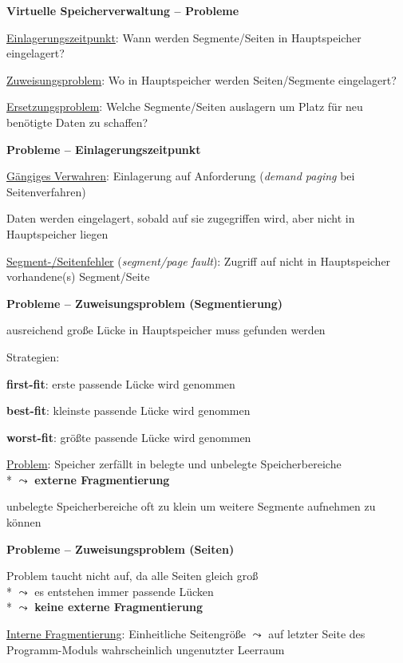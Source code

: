 \newpage

\textbf{Virtuelle Speicherverwaltung -- Probleme}
\begin{items}
  \item \underline{Einlagerungszeitpunkt}: Wann werden Segmente/Seiten in Hauptspeicher eingelagert?
  \item \underline{Zuweisungsproblem}: Wo in Hauptspeicher werden Seiten/Segmente eingelagert?
  \item \underline{Ersetzungsproblem}: Welche Segmente/Seiten auslagern um Platz für neu benötigte Daten zu schaffen?
\end{items}

\textbf{Probleme -- Einlagerungszeitpunkt}
\begin{items}
  \item \underline{Gängiges Verwahren}: Einlagerung auf Anforderung (\emph{demand paging} bei Seitenverfahren)
  \item Daten werden eingelagert, sobald auf sie zugegriffen wird, aber nicht in Hauptspeicher liegen
  \item \underline{Segment-/Seitenfehler} (\emph{segment/page fault}): Zugriff auf nicht in Hauptspeicher vorhandene(s) Segment/Seite
\end{items}

\textbf{Probleme -- Zuweisungsproblem (Segmentierung)}
\begin{items}
  \item ausreichend große Lücke in Hauptspeicher muss gefunden werden
  \item Strategien:
  \begin{enumeration}
    \item \textbf{first-fit}: erste passende Lücke wird genommen
    \item \textbf{best-fit}: kleinste passende Lücke wird genommen
    \item \textbf{worst-fit}: größte passende Lücke wird genommen
  \end{enumeration}
  \item \underline{Problem}: Speicher zerfällt in belegte und unbelegte Speicherbereiche \\*
    \( \leadsto \) \textbf{externe Fragmentierung}
  \item unbelegte Speicherbereiche oft zu klein um weitere Segmente aufnehmen zu können
\end{items}

\textbf{Probleme -- Zuweisungsproblem (Seiten)}
\begin{items}
  \item Problem taucht nicht auf, da alle Seiten gleich groß \\*
    \( \leadsto \) es entstehen immer passende Lücken \\*
    \( \leadsto \) \textbf{keine externe Fragmentierung}
  \item \underline{Interne Fragmentierung}: Einheitliche Seitengröße \( \leadsto \) auf letzter Seite des Programm-Moduls wahrscheinlich ungenutzter Leerraum
\end{items}

